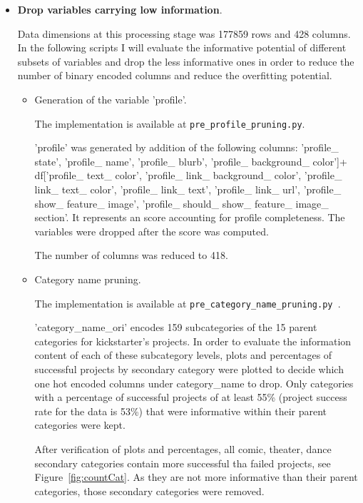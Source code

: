 \documentclass{article}
\begin{document}
\begin{itemize}
    \item \textbf{Drop variables carrying low information}.
    
    Data dimensions at this processing stage was 177859 rows and 428 columns. In the following scripts I will evaluate the informative potential of different subsets of variables and drop the less informative ones in order to reduce the number of binary encoded columns and reduce the overfitting potential.
    
    \begin{itemize}
	\item Generation of the variable 'profile'.
	
        The implementation is available at {\tt pre\_profile\_pruning.py}.
	
	'profile' was generated by addition of the following columns: 'profile\_ state', 'profile\_ name', 'profile\_ blurb', 'profile\_ background\_ color']+ df['profile\_ text\_ color', 'profile\_ link\_ background\_ color', 'profile\_ link\_ text\_ color', 'profile\_ link\_ text', 'profile\_ link\_ url', 'profile\_ show\_ feature\_ image', 'profile\_ should\_ show\_ feature\_ image\_ section'. It represents an score accounting for profile completeness. The variables were dropped after the score was computed.
        
	The number of columns was reduced to 418.
	
	\item Category name pruning.
	
	The implementation is available at {\tt pre\_category\_name\_pruning.py }.
	
	'category\_name\_ori' encodes 159 subcategories of the 15 parent categories for kickstarter's projects. In order to evaluate the information content of each of these subcategory levels, plots and percentages of successful projects by secondary category were plotted to decide which one hot encoded columns under category\_name to drop. Only categories with a percentage of successful projects of at least 55\% (project success rate for the data is 53\%) that were informative within their parent categories were kept.
	
	After verification of plots and percentages, all comic, theater, dance secondary categories contain more successful tha failed projects, see Figure~\ref{fig:countCat}. As they are not more informative than their parent categories, those secondary categories were removed. 
	

\end{itemize}
\end{itemize}
\end{document}
